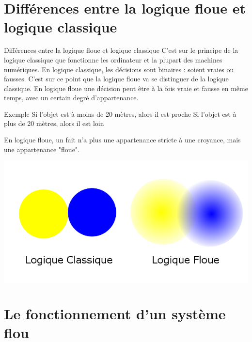 \documentclass[aspectratio=169,professionalfonts, 12pt]{beamer}
\begin{document}
\begin{frame}
\begin{columns}[T]
  \end{columns}
\end{frame}

\section{Différences entre la logique floue et logique classique}

\begin{frame}{Différences entre la logique floue et logique classique}
  C’est sur le principe de la logique classique que fonctionne les ordinateur et
  la plupart des machines numériques. En logique classique, les décisions sont
  binaires : soient vraies ou fausses. C’est sur ce point que la logique floue 
  va se distinguer de la logique classique. En logique floue une décision peut
  être à la fois vraie et fausse en même temps, avec un certain degré
  d'appartenance.
\end{frame}

\begin{frame}
   \begin{block}{Exemple}
    Si l'objet est à moins de 20 mètres, alors il est proche \newline
    Si l'objet est à plus de 20 mètres, alors il est loin
   \end{block}
   En logique floue, un fait n'a plus une appartenance
   stricte à une croyance, mais une appartenance "floue".
   \begin{center}
     \includegraphics[height=0.4\textwidth]{images/logique_floue.png}
   \end{center}
\end{frame}

\section{Le fonctionnement d’un système flou}
\end{document}
